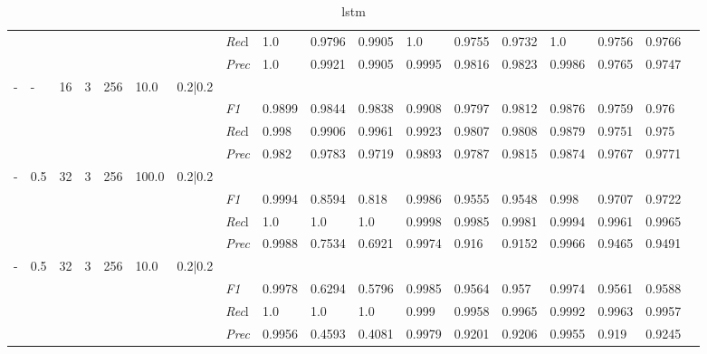 \begin{table}[]
\begin{tabularx}{\textwidth}{XXXXXXX|X|XXX|XXX|XXXX}
& & & & & & & \textit{Rec}l & 1.0 & 0.9796 & 0.9905    & 1.0 & 0.9755    & 0.9732    & 1.0    & 0.9756    & 0.9766    \\
& & & & & & & \textit{Prec} & 1.0 & 0.9921 & 0.9905 & 0.9995 & 0.9816 & 0.9823 & 0.9986 & 0.9765 & 0.9747 \\ \midrule
- & - & 16 & 3 & 256 &10.0 & 0.2|0.2 & & & & & & & & & \\
& & & & & & & \textit{F1} & 0.9899 & 0.9844 & 0.9838 & 0.9908 & 0.9797        & 0.9812        & 0.9876        & 0.9759        & 0.976        \\
& & & & & & & \textit{Rec}l & 0.998 & 0.9906 & 0.9961    & 0.9923 & 0.9807    & 0.9808    & 0.9879    & 0.9751    & 0.975    \\
& & & & & & & \textit{Prec} & 0.982 & 0.9783 & 0.9719 & 0.9893 & 0.9787 & 0.9815 & 0.9874 & 0.9767 & 0.9771 \\ \midrule
- & 0.5 & 32 & 3 & 256 &100.0 & 0.2|0.2 & & & & & & & & & \\
& & & & & & & \textit{F1} & 0.9994 & 0.8594 & 0.818 & 0.9986 & 0.9555        & 0.9548        & 0.998        & 0.9707        & 0.9722        \\
& & & & & & & \textit{Rec}l & 1.0 & 1.0 & 1.0    & 0.9998 & 0.9985    & 0.9981    & 0.9994    & 0.9961    & 0.9965    \\
& & & & & & & \textit{Prec} & 0.9988 & 0.7534 & 0.6921 & 0.9974 & 0.916 & 0.9152 & 0.9966 & 0.9465 & 0.9491 \\ \midrule
- & 0.5 & 32 & 3 & 256 &10.0 & 0.2|0.2 & & & & & & & & & \\
& & & & & & & \textit{F1} & 0.9978 & 0.6294 & 0.5796 & 0.9985 & 0.9564        & 0.957        & 0.9974        & 0.9561        & 0.9588        \\
& & & & & & & \textit{Rec}l & 1.0 & 1.0 & 1.0    & 0.999 & 0.9958    & 0.9965    & 0.9992    & 0.9963    & 0.9957    \\
& & & & & & & \textit{Prec} & 0.9956 & 0.4593 & 0.4081 & 0.9979 & 0.9201 & 0.9206 & 0.9955 & 0.919 & 0.9245 \\ \midrule
\end{tabularx}
\caption{lstm}
\label{tab:all_results_lstm}
\end{table}